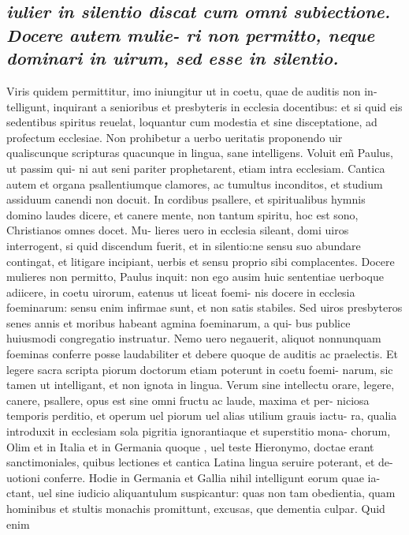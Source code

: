 \documentclass{article}
\begin{document}
\begin{pages}
\subsection*{\textit{iulier in silentio discat cum omni subiectione. Docere autem mulie- ri non permitto, neque dominari in uirum, sed esse in silentio. }}\pstart Viris quidem permittitur, imo iniungitur ut in coetu, quae de auditis non in- telligunt, inquirant a senioribus et presbyteris in ecclesia docentibus: et si quid eis sedentibus spiritus reuelat, loquantur cum modestia et sine disceptatione, ad profectum ecclesiae. Non prohibetur a uerbo ueritatis proponendo uir qualiscunque  scripturas quacunque in lingua, sane intelligens. Voluit em̃ Paulus, ut passim qui- ni aut seni pariter prophetarent, etiam intra ecclesiam. Cantica autem et organa psallentiumque clamores, ac tumultus inconditos, et studium assiduum canendi non docuit. In cordibus psallere, et spiritualibus hymnis domino laudes dicere, et canere mente, non tantum spiritu, hoc est sono, Christianos omnes docet. Mu- lieres uero in ecclesia sileant, domi uiros interrogent, si quid discendum fuerit, et in silentio:ne sensu suo abundare contingat, et litigare incipiant, uerbis et sensu proprio sibi complacentes. Docere mulieres non permitto, Paulus inquit: non ego ausim huic sententiae uerboque adiicere, in coetu uirorum, eatenus ut liceat foemi- nis docere in ecclesia foeminarum: sensu enim infirmae sunt, et non satis stabiles. Sed uiros presbyteros senes annis et moribus habeant agmina foeminarum, a qui- bus publice huiusmodi congregatio instruatur. Nemo uero negauerit, aliquot nonnunquam foeminas conferre posse laudabiliter et debere quoque de auditis ac praelectis. Et legere sacra scripta piorum doctorum etiam poterunt in coetu foemi- narum, sic tamen ut intelligant, et non ignota in lingua. Verum sine intellectu orare, legere, canere, psallere, opus est sine omni fructu ac laude, maxima et per- niciosa temporis perditio, et operum uel piorum uel alias utilium grauis iactu- ra, qualia introduxit in ecclesiam sola pigritia ignorantiaque et superstitio mona- chorum, Olim et in Italia et in Germania quoque , uel teste Hieronymo, doctae erant sanctimoniales, quibus lectiones et cantica Latina lingua seruire poterant, et de- uotioni conferre. Hodie in Germania et Gallia nihil intelligunt eorum quae ia- ctant, uel sine iudicio aliquantulum suspicantur: quas non tam obedientia, quam hominibus et stultis monachis promittunt, excusas, que dementia culpar. Quid enim  \pend

\end{pages}
\end{document}
